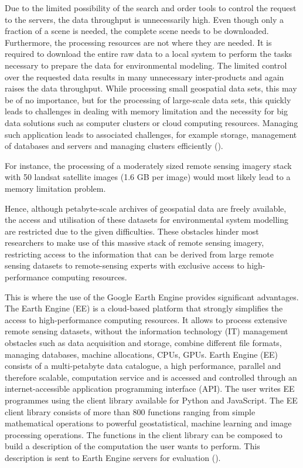 Due to the limited possibility of the search and order tools to control the request to the servers, the data throughput is unnecessarily high. Even though only a fraction of a scene is needed, the complete scene needs to be downloaded. Furthermore, the processing resources are not where they are needed. It is required to download the entire raw data to a local system to perform the tasks necessary to prepare the data for environmental modeling. The limited control over the requested data results in many unnecessary inter-products and again raises the data throughput. While processing small geospatial data sets, this may be of no importance, but for the processing of large-scale data sets, this quickly leads to challenges in dealing with memory limitation and the necessity for big data solutions such as computer clusters or cloud computing resources.
Managing such application leads to associated challenges, for example storage, management of databases and servers and managing clusters efficiently (\cite{gorelick2017google}). 

For instance, the processing of a moderately sized remote sensing imagery stack with 50 landsat satellite images (1.6 GB per image) would most likely lead to a memory limitation problem.

Hence, although petabyte-scale archives of geospatial data are freely available, the access and utilisation of these datasets for environmental system modelling are restricted due to the given difficulties. 
These obstacles hinder most researchers to make use of this massive stack of remote sensing imagery, restricting access to the information that can be derived from large remote sensing datasets to remote-sensing experts with exclusive access to high-performance computing resources.

\newpage

This is where the use of the Google Earth Engine provides significant advantages.
The Earth Engine (EE) is a cloud-based platform that strongly simplifies the access to high-performance computing resources. It allows to process extensive remote sensing datasets, without the information technology (IT) management obstacles such as data acquisition and storage, combine different file formats, managing databases, machine allocations, CPUs, GPUs. 
Earth Engine (EE) consists of a multi-petabyte data catalogue, a high performance, parallel and therefore scalable, computation service and is accessed and controlled through an internet-accessible application programming interface (API). The user writes EE programmes using the client library available for Python and JavaScript.
The EE client library consists of more than 800 functions ranging from simple mathematical operations to powerful geostatistical, machine learning and image processing operations.
The functions in the client library can be composed to build a description of the computation the user wants to perform. This description is sent to Earth Engine servers for evaluation (\cite{gorelick2017google}).

